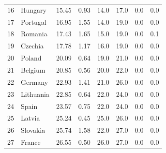 \begin{longtable}{@{}rl S[table-format=2.2] S[table-format=1.2] S[table-format=2.1] S[table-format=2.1] S[table-format=3.1] S[table-format=3.1]@{}}
  16 & Hungary & 15.45 & 0.93 & 14.0 & 17.0 & 0.0 & 0.0 \\
  17 & Portugal & 16.95 & 1.55 & 14.0 & 19.0 & 0.0 & 0.0 \\
  18 & Romania & 17.43 & 1.65 & 15.0 & 19.0 & 0.0 & 0.1 \\
  19 & Czechia & 17.78 & 1.17 & 16.0 & 19.0 & 0.0 & 0.0 \\
  20 & Poland & 20.09 & 0.64 & 19.0 & 21.0 & 0.0 & 0.0 \\
  21 & Belgium & 20.85 & 0.56 & 20.0 & 22.0 & 0.0 & 0.0 \\
  22 & Germany & 22.93 & 1.41 & 21.0 & 26.0 & 0.0 & 0.0 \\
  23 & Lithuania & 22.85 & 0.64 & 22.0 & 24.0 & 0.0 & 0.0 \\
  24 & Spain & 23.57 & 0.75 & 22.0 & 24.0 & 0.0 & 0.0 \\
  25 & Latvia & 25.24 & 0.45 & 25.0 & 26.0 & 0.0 & 0.0 \\
  26 & Slovakia & 25.74 & 1.58 & 22.0 & 27.0 & 0.0 & 0.0 \\
  27 & France & 26.55 & 0.50 & 26.0 & 27.0 & 0.0 & 0.0 \\
\end{longtable}